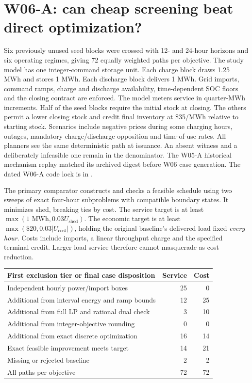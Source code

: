 \documentclass[10pt,letterpaper]{article}
\begin{document}
\section{W06-A: can cheap screening beat direct optimization?}
Six previously unused seed blocks were crossed with 12- and 24-hour horizons and six operating regimes, giving 72 equally weighted paths per objective. The study model has one integer-command storage unit. Each charge block draws 1.25 MWh and stores 1 MWh. Each discharge block delivers 1 MWh. Grid imports, command ramps, charge and discharge availability, time-dependent SOC floors and the closing contract are enforced. The model meters service in quarter-MWh increments. Half of the seed blocks require the initial stock at closing. The others permit a lower closing stock and credit final inventory at \$35/MWh relative to starting stock. Scenarios include negative prices during some charging hours, outages, mandatory charge/discharge opposition and time-of-use rates. All planners see the same deterministic path at issuance. An absent witness and a deliberately infeasible one remain in the denominator. The W05-A historical mechanism replay matched its archived digest before W06 case generation. The dated W06-A code lock is in .

The primary comparator constructs and checks a feasible schedule using two sweeps of exact four-hour subproblems with compatible boundary states. It minimizes shed, breaking ties by cost. The service target is at least $\max(1\text{ MWh},0.03 U_\text{shed})$. The economic target is at least $\max(\$20,0.03|U_\text{cost}|)$, holding the original baseline's delivered load fixed \emph{every hour}. Costs include imports, a linear throughput charge and the specified terminal credit. Larger load service therefore cannot masquerade as cost reduction.

\begin{center}
\begin{tabular}{lrr}
\toprule
First exclusion tier or final case disposition & Service & Cost \\
\midrule
Independent hourly power/import boxes & 25 & 0 \\
Additional from interval energy and ramp bounds & 12 & 25 \\
Additional from full LP and rational dual check & 3 & 10 \\
Additional from integer-objective rounding & 0 & 0 \\
Additional from exact discrete optimization & 16 & 14 \\
Exact feasible improvement meets target & 14 & 21 \\
Missing or rejected baseline & 2 & 2 \\
\midrule
All paths per objective & 72 & 72 \\
\bottomrule
\end{tabular}
\end{center}
\end{document}
